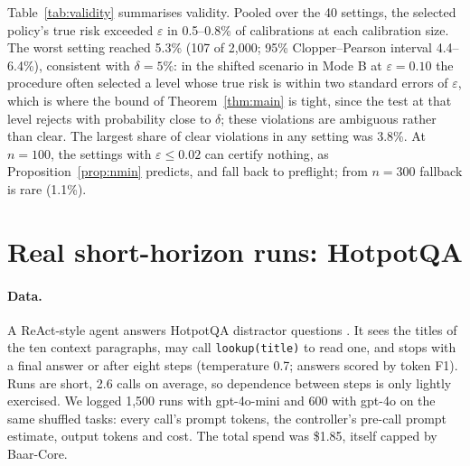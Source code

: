 \documentclass[11pt]{article}
\theoremstyle{remark}
\begin{document}
Table~\ref{tab:validity} summarises validity. Pooled over the 40 settings, the
selected policy's true risk exceeded $\varepsilon$ in 0.5--0.8\% of
calibrations at each calibration size. The worst setting reached 5.3\% (107 of
2{,}000; 95\% Clopper--Pearson interval 4.4--6.4\%), consistent with
$\delta = 5\%$: in the shifted scenario in Mode B at $\varepsilon = 0.10$ the
procedure often selected a level whose true risk is within two standard errors
of $\varepsilon$, which is where the bound of Theorem~\ref{thm:main} is tight,
since the test at that level rejects with probability close to $\delta$; these
violations are ambiguous rather than clear. The largest share of clear
violations in any setting was 3.8\%. At
$n = 100$, the settings with $\varepsilon \le 0.02$ can certify nothing, as
Proposition~\ref{prop:nmin} predicts, and fall back to preflight; from
$n = 300$ fallback is rare (1.1\%).

\section{Real short-horizon runs: HotpotQA}\label{sec:hotpot}

\paragraph{Data.}
A ReAct-style agent \citep{yao2023react} answers HotpotQA distractor questions
\citep{yang2018hotpotqa}. It sees the titles of the ten context paragraphs, may
call \texttt{lookup(title)} to read one, and stops with a final answer or after
eight steps (temperature 0.7; answers scored by token F1). Runs are short,
2.6 calls on average, so dependence between steps is only lightly exercised. We logged 1{,}500
runs with gpt-4o-mini and 600 with gpt-4o on the same shuffled tasks: every
call's prompt tokens, the controller's pre-call prompt estimate, output tokens
and cost. The total spend was \$1.85, itself capped by Baar-Core.
\end{document}
